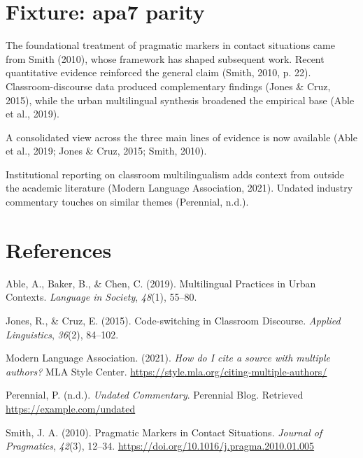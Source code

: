 

\hypertarget{fixture-apa7-parity}{%
\section{Fixture: apa7 parity}\label{fixture-apa7-parity}}

The foundational treatment of pragmatic markers in contact situations
came from Smith (2010), whose framework has shaped subsequent work.
Recent quantitative evidence reinforced the general claim (Smith, 2010,
p. 22). Classroom-discourse data produced complementary findings (Jones
\& Cruz, 2015), while the urban multilingual synthesis broadened the
empirical base (Able et al., 2019).

A consolidated view across the three main lines of evidence is now
available (Able et al., 2019; Jones \& Cruz, 2015; Smith, 2010).

Institutional reporting on classroom multilingualism adds context from
outside the academic literature (Modern Language Association, 2021).
Undated industry commentary touches on similar themes (Perennial, n.d.).

\hypertarget{bibliography}{%
\section*{References}\label{bibliography}}

\hypertarget{refs}{}
\begin{CSLReferences}{1}{0}
\leavevmode{}%
Able, A., Baker, B., \& Chen, C. (2019). Multilingual Practices in Urban
Contexts. \emph{Language in Society}, \emph{48}(1), 55--80.

\leavevmode{}%
Jones, R., \& Cruz, E. (2015). Code-switching in Classroom Discourse.
\emph{Applied Linguistics}, \emph{36}(2), 84--102.

\leavevmode{}%
Modern Language Association. (2021). \emph{How do I cite a source with
multiple authors?} MLA Style Center.
\url{https://style.mla.org/citing-multiple-authors/}

\leavevmode{}%
Perennial, P. (n.d.). \emph{Undated Commentary}. Perennial Blog.
Retrieved \url{https://example.com/undated}

\leavevmode{}%
Smith, J. A. (2010). Pragmatic Markers in Contact Situations.
\emph{Journal of Pragmatics}, \emph{42}(3), 12--34.
\url{https://doi.org/10.1016/j.pragma.2010.01.005}

\end{CSLReferences}

